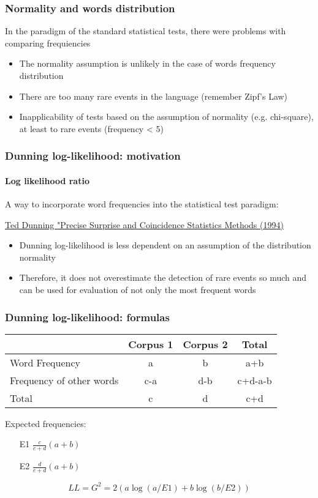 \documentclass[svgnames]{beamer}
\begin{document}
\begin{frame}
  \frametitle{Normality and words distribution}

In the paradigm of the standard statistical tests, there were problems with comparing frequiencies

  \begin{itemize}
  \item The normality assumption is unlikely in the case of words frequency distribution
  \item There are too many rare events in the language (remember Zipf's Law)
  \item Inapplicability of tests based on the assumption of normality (e.g. chi-square), at least to rare events (frequency < 5)
  \end{itemize}
\end{frame}


\begin{frame}
  \frametitle{Dunning log-likelihood: motivation}
  \framesubtitle{Log likelihood ratio}

A way to incorporate word frequencies into the statistical test paradigm:

  \href{https://aclanthology.org/J93-1003.pdf}{Ted Dunning "Precise
    Surprise and Coincidence Statistics Methods (1994)}
  \begin{itemize}
  \item Dunning log-likelihood is less dependent on an assumption of the distribution normality
  \item Therefore, it does not overestimate the detection of rare events so much and
    can be used for evaluation of not only the most frequent words
  \end{itemize}
\end{frame}


\begin{frame}
  \frametitle{Dunning log-likelihood: formulas}
  \begin{tabular}[c]{|p{}|c|c|c|}
    \hline
   & Corpus 1 & Corpus 2 & Total \\
    \hline
    Word Frequency & a & b & a+b \\
    \hline
    Frequency of other words & c-a & d-b & c+d-a-b \\
    \hline
    Total & c & d & c+d \\
    \hline
  \end{tabular}

\bigskip
  Expected frequencies:
  \begin{itemize}
  \item[E1] $\frac{c}{c+d}(a+b)$
  \item[E2] $\frac{d}{c+d}(a+b)$
  \end{itemize}

  \begin{equation}
    LL = G^2 = 2 (a \log (a/E1) + b \log (b/E2) ) 
  \end{equation}
\end{frame}
\end{document}
